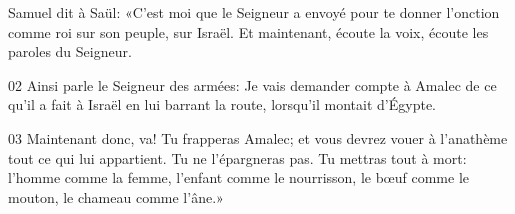 Samuel dit à Saül: «C’est moi que le Seigneur a envoyé pour te donner l’onction comme roi sur son peuple, sur Israël. Et maintenant, écoute la voix, écoute les paroles du Seigneur.

02 Ainsi parle le Seigneur des armées: Je vais demander compte à Amalec de ce qu’il a fait à Israël en lui barrant la route, lorsqu’il montait d’Égypte.

03 Maintenant donc, va! Tu frapperas Amalec; et vous devrez vouer à l’anathème tout ce qui lui appartient. Tu ne l’épargneras pas. Tu mettras tout à mort: l’homme comme la femme, l’enfant comme le nourrisson, le bœuf comme le mouton, le chameau comme l’âne.»
